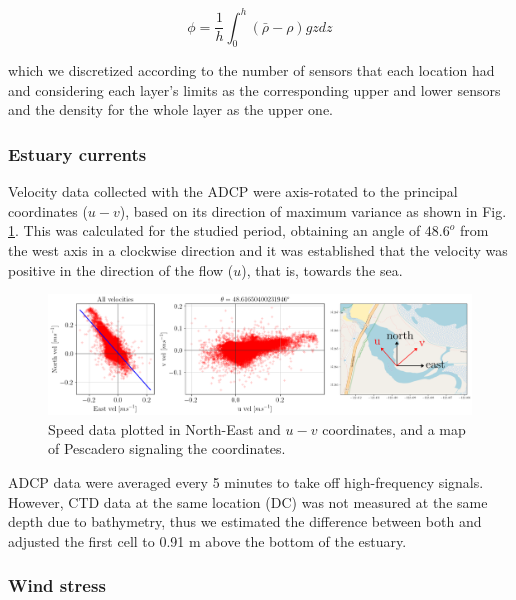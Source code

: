 \documentclass[tesis.tex]{subfiles}
\begin{document}
\begin{equation}
    \phi=\frac{1}{h}\int^h_0(\bar{\rho}-\rho)gzdz
    \label{eq: phi}
\end{equation}

which we discretized according to the number of sensors that each location had and considering each layer's limits as the corresponding upper and lower sensors and the density for the whole layer as the upper one. 

\subsubsection{Estuary currents} \label{Estuary_currents}

Velocity data collected with the ADCP were axis-rotated to the principal coordinates ($u-v$), based on its direction of maximum variance as shown in Fig. \ref{fig:rotacion}. This was calculated for the studied period, obtaining an angle of $48.6^o$ from the west axis in a clockwise direction and it was established that the velocity was positive in the direction of the flow ($u$), that is, towards the sea.  \\

\begin{figure}[h!]
    \centering
    \includegraphics[width=\textwidth]{Imagenes/rotacion.png}
    \caption{Speed data plotted in North-East and $u-v$ coordinates, and a map of Pescadero signaling the coordinates.}
    \label{fig:rotacion}
\end{figure}

ADCP data were averaged every 5 minutes to take off high-frequency signals. However, CTD data at the same location (DC) was not measured at the same depth due to bathymetry, thus we estimated the difference between both and adjusted the first cell to 0.91 m above the bottom of the estuary. \\

\subsubsection{Wind stress}
\end{document}
